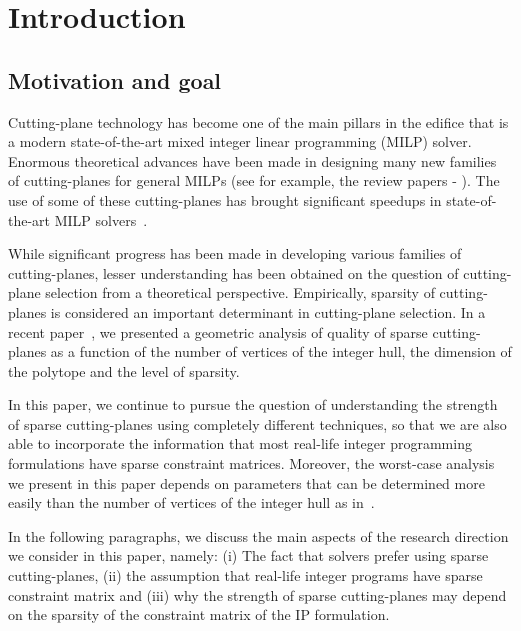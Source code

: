 \documentclass[smallextended]{svjour3}
\begin{document}
\section {Introduction}
\subsection{Motivation and goal}
Cutting-plane technology has become one of the main pillars in the edifice that is a modern state-of-the-art mixed integer linear programming (MILP) solver. Enormous theoretical advances have been made in designing many new families of cutting-planes for general MILPs (see for example, the review papers - \cite{marchand:ma:we:wo:2002,RichardDey}). The use of some of these cutting-planes has brought significant speedups in state-of-the-art MILP solvers~\cite{bixby2004,Lodi2009}.

While significant progress has been made in developing various families of cutting-planes, lesser understanding has been obtained on the question of cutting-plane selection from a theoretical perspective. Empirically, sparsity of cutting-planes is considered an important determinant in cutting-plane selection. In a recent paper~\cite{deyMolinaroWang:2015}, we presented a geometric analysis of quality of {sparse cutting-planes} as a function of the number of vertices of the integer hull, the dimension of the polytope and the level of sparsity. 

In this paper, we continue to pursue the question of understanding the strength of sparse cutting-planes using completely different techniques, so that we are also able to incorporate the information that most real-life integer programming formulations have sparse constraint matrices. Moreover, the worst-case analysis we present in this paper depends on parameters that can be determined more easily than the number of vertices of the integer hull as in~\cite{deyMolinaroWang:2015}. 	

In the following paragraphs, we discuss the main aspects of the research direction we consider in this paper, namely: (i) The fact that solvers prefer using sparse cutting-planes, (ii) the assumption that real-life integer programs have sparse constraint matrix and (iii) why the strength of sparse cutting-planes may depend on the sparsity of the constraint matrix of the IP formulation.
\end{document}
